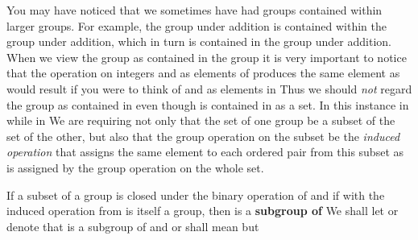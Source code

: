 \documentclass[11pt,oneside]{article}
\begin{document}
\fi
\renewcommand{\BookFooter}{Section 5 Subgroups}
\ifdefined\BookMaster\else\setcounter{page}{52}\fi
\BookNarrativetrue

\begin{BookBody}



\noindent You may have noticed that we sometimes have had groups contained within larger groups. For example, the group  under addition is contained within the group  under addition, which in turn is contained in the group  under addition. When we view the group  as contained in the group  it is very important to notice that the operation \BookInline{+ } on integers  and  as elements of  produces the same element  as would result if you were to think of  and  as elements in  Thus we should \textit{not} regard the group  as contained in  even though  is contained in  as a set. In this instance in  while  in  We are requiring not only that the set of one group be a subset of the set of the other, but also that the group operation on the subset be the\textit{ induced operation} that assigns the same element to each ordered pair from this subset as is assigned by the group operation on the whole set.

 If a subset  of a group  is closed under the binary operation of  and if  with the induced operation from  is itself a group, then  is a\textbf{ subgroup of}  We shall let  or  denote that  is a subgroup of  and  or  shall mean  but \BookEnd{\blacksquare}


\end{BookBody}
\end{document}
